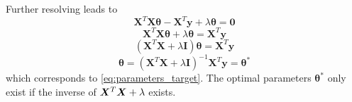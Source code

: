 Further resolving leads to
\begin{equation}
\bm X^T\bm X\bm\theta-\bm X^T\bm y+\lambda\bm\theta=\bm 0
\end{equation}
\begin{equation}
\bm X^T\bm X\bm\theta+\lambda\bm\theta=\bm X^T\bm y
\end{equation}
\begin{equation}
(\bm X^T\bm X+\lambda\bm I)\bm\theta=\bm X^T\bm y
\end{equation}
\begin{equation}
\bm\theta=(\bm X^T\bm X+\lambda\bm I)^{-1}\bm X^T\bm y=\bm\theta^*
\end{equation}
which corresponds to \eqref{eq:parameters_target}. The optimal parameters $\bm\theta^*$ only exist if the inverse of $\bm X^T\bm X+\lambda\bm$ exists.